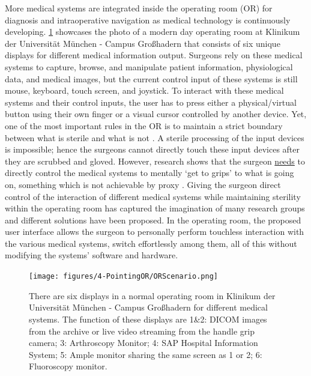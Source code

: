 More medical systems are integrated inside the operating room (OR) for diagnosis and intraoperative navigation as medical technology is continuously developing. \figurename{\ref{fig:4-PointingOR:ORScenario}} showcases the photo of a modern day operating room at Klinikum der Universit\"at M\"unchen - Campus Gro{\ss}hadern that consists of six unique displays for different medical information output.
Surgeons rely on these medical systems to capture, browse, and manipulate patient information, physiological data, and medical images, but the current control input of these systems is still mouse, keyboard, touch screen, and joystick. To interact with these medical systems and their control inputs, the user has to press either a physical/virtual button using their own finger or a visual cursor controlled by another device.
Yet, one of the most important rules in the OR is to maintain a strict boundary between what is sterile and what is not \cite{OHara2014a}. A sterile processing of the input devices is impossible; hence the surgeons cannot directly touch these input devices after they are scrubbed and gloved. However, research shows that the surgeon \underline{needs} to directly control the medical systems to mentally `get to grips' to what is going on, something which is not achievable by proxy \cite{Johnson2011a}. Giving the surgeon direct control of the interaction of different medical systems while maintaining sterility within the operating room has captured the imagination of many research groups and different solutions have been proposed.
In the operating room, the proposed user interface allows the surgeon to personally perform touchless interaction with the various medical systems, switch effortlessly among them, all of this without modifying the systems' software and hardware.
\begin{figure} [htb]
	\texttt{[image: figures/4-PointingOR/ORScenario.png]}
	\caption{There are six displays in a normal operating room in Klinikum der Universit\"at M\"unchen - Campus Gro{\ss}hadern for different medical systems. The function of these displays are 1\&2: DICOM images from the archive or live video streaming from the handle grip camera; 3: Arthroscopy Monitor; 4: SAP Hospital Information System; 5: Ample monitor sharing the same screen as 1 or 2; 6: Fluoroscopy monitor.}
	\label{fig:4-PointingOR:ORScenario}       %
\end{figure}
